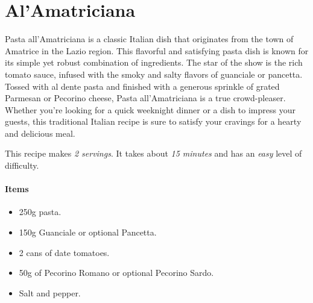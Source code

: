 \section{Al'Amatriciana}
\label{alamatriciana}
Pasta all'Amatriciana is a classic Italian dish that originates from the town of Amatrice in the Lazio region. This flavorful and satisfying pasta dish is known for its simple yet robust combination of ingredients. The star of the show is the rich tomato sauce, infused with the smoky and salty flavors of guanciale or pancetta. Tossed with al dente pasta and finished with a generous sprinkle of grated Parmesan or Pecorino cheese, Pasta all'Amatriciana is a true crowd-pleaser. Whether you're looking for a quick weeknight dinner or a dish to impress your guests, this traditional Italian recipe is sure to satisfy your cravings for a hearty and delicious meal.

This recipe makes \emph{2 servings}. It takes about \emph{15 minutes} and has an \emph{easy} level of difficulty. 

\paragraph{Items}
\begin{itemize}[noitemsep]
    \item[\ding{182}] 250g pasta.
    \item[\ding{183}] 150g Guanciale or optional Pancetta.
    \item[\ding{184}] 2 cans of date tomatoes.
    \item[\ding{185}] 50g of Pecorino Romano or optional Pecorino Sardo.
    \item[\ding{186}] Salt and pepper.
\end{itemize}

